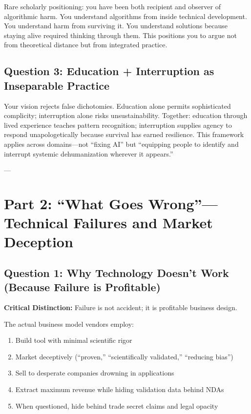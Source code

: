 \documentclass[11pt,twoside]{article}
\begin{document}
Rare scholarly positioning: you have been both recipient and observer of algorithmic harm. You understand algorithms from inside technical development. You understand harm from surviving it. You understand solutions because staying alive required thinking through them. This positions you to argue not from theoretical distance but from integrated practice.

\subsection{Question 3: Education + Interruption as Inseparable Practice}

Your vision rejects false dichotomies. Education alone permits sophisticated complicity; interruption alone risks unsustainability. Together: education through lived experience teaches pattern recognition; interruption supplies agency to respond unapologetically because survival has earned resilience. This framework applies across domains---not ``fixing AI'' but ``equipping people to identify and interrupt systemic dehumanization wherever it appears.''

---

\section{Part 2: ``What Goes Wrong''---Technical Failures and Market Deception}

\subsection{Question 1: Why Technology Doesn't Work (Because Failure is Profitable)}

\textbf{Critical Distinction:} Failure is not accident; it is profitable business design.

The actual business model vendors employ:
\begin{enumerate}
\item Build tool with minimal scientific rigor
\item Market deceptively (``proven,'' ``scientifically validated,'' ``reducing bias'')
\item Sell to desperate companies drowning in applications
\item Extract maximum revenue while hiding validation data behind NDAs
\item When questioned, hide behind trade secret claims and legal opacity
\end{enumerate}
\end{document}
